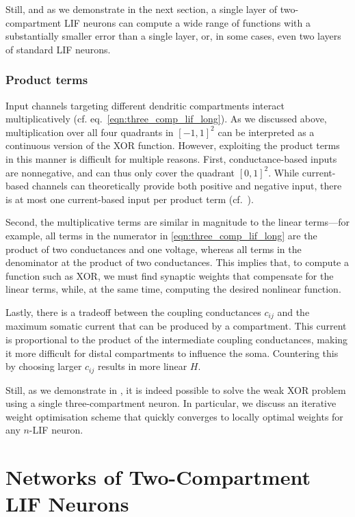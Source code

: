 Still, and as we demonstrate in the next section, a single layer of two-compartment LIF neurons can compute a wide range of functions with a substantially smaller error than a single layer, or, in some cases, even two layers of standard LIF neurons.

\subsubsection{Product terms}
Input channels targeting different dendritic compartments interact multiplicatively (cf. eq.~\ref{eqn:three_comp_lif_long}).
As we discussed above, multiplication over all four quadrants in $[-1, 1]^2$ can be interpreted as a continuous version of the XOR function.
However, exploiting the product terms in this manner is difficult for multiple reasons.
First, conductance-based inputs are nonnegative, and can thus only cover the quadrant $[0, 1]^2$.
While current-based channels can theoretically provide both positive and negative input, there is at most one current-based input per product term (cf.~).

Second, the multiplicative terms are similar in magnitude to the linear terms---for example, all terms in the numerator in \cref{eqn:three_comp_lif_long} are the product of two conductances and one voltage, whereas all terms in the denominator at the product of two conductances.
This implies that, to compute a function such as XOR, we must find synaptic weights that compensate for the linear terms, while, at the same time, computing the desired nonlinear function.

Lastly, there is a tradeoff between the coupling conductances $c_{ij}$ and the maximum somatic current that can be produced by a compartment.
This current is proportional to the product of the intermediate coupling conductances, making it more difficult for distal compartments to influence the soma.
Countering this by choosing larger $c_{ij}$ results in more linear $H$.

Still, as we demonstrate in , it is indeed possible to solve the weak XOR problem using a single three-compartment neuron.
In particular, we discuss an iterative weight optimisation scheme that quickly converges to locally optimal weights for any $n$-LIF neuron.

\section{Networks of Two-Compartment LIF Neurons}
\label{sec:two_comp_lif}

